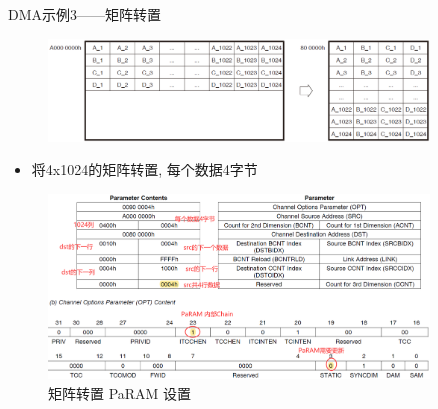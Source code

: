 \documentclass[10pt]{ctexbeamer}
\begin{document}
    \begin{frame}[allowframebreaks]{DMA示例3——矩阵转置}
        \begin{figure}
            \centering
            \includegraphics[width=0.9\textwidth]{summary/16.eps}
        \end{figure}
        \vspace{0.5cm}
        \begin{itemize}
            \item 将4x1024的矩阵转置, 每个数据4字节
        \end{itemize}
        
        \begin{figure}
            \centering
            \includegraphics[width=0.9\textwidth]{summary/17.eps}
            \caption{矩阵转置 PaRAM 设置}
        \end{figure}
    \end{frame}
\end{document}

